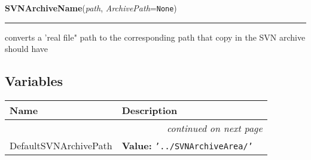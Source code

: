     \label{System:SVNOperations:SVNArchiveName}

    \vspace{0.5ex}

\hspace{.8\funcindent}\begin{boxedminipage}{\funcwidth}

    \raggedright \textbf{SVNArchiveName}(\textit{path}, \textit{ArchivePath}={\tt None})

    \vspace{-1.5ex}

    \rule{\textwidth}{0.5\fboxrule}
\setlength{\parskip}{2ex}
    converts a 'real file" path to the corresponding path that copy in the 
    SVN archive should have

\setlength{\parskip}{1ex}
    \end{boxedminipage}



  \subsection{Variables}

    \vspace{-1cm}
\hspace{\varindent}\begin{longtable}{|p{\varnamewidth}|p{\vardescrwidth}|l}
\cline{1-2}
\cline{1-2} \centering \textbf{Name} & \centering \textbf{Description}& \\
\cline{1-2}
\endhead\cline{1-2}\multicolumn{3}{r}{\small\textit{continued on next page}}\\\endfoot\cline{1-2}
\endlastfoot\raggedright D\-e\-f\-a\-u\-l\-t\-S\-V\-N\-A\-r\-c\-h\-i\-v\-e\-P\-a\-t\-h\- & \raggedright \textbf{Value:} 
{\tt '../SVNArchiveArea/'}&\\
\cline{1-2}
\end{longtable}

